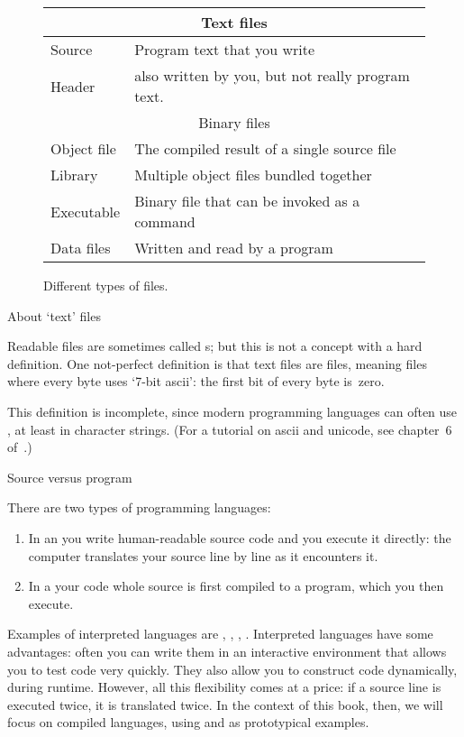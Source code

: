\begin{figure}[ht]
  \begin{tabular}{|l|l|}
    \midrule
    \multicolumn{2}{|c|}{Text files}\\
    \midrule
    Source&Program text that you write\\
    Header&also written by you, but not really program text.\\
    \midrule
    \multicolumn{2}{|c|}{Binary files}\\
    \midrule
    Object file&The compiled result of a single source file\\
    Library&Multiple object files bundled together\\
    Executable&Binary file that can be invoked as a command\\
    Data files&Written and read by a program\\
    \midrule
  \end{tabular}
  \caption{Different types of files.}
  \label{fig:file-types}
\end{figure}

 {About `text' files}

Readable files are sometimes called s;
but this is not a concept with a hard definition.
One not-perfect definition is that text files are  files,
meaning files where every byte uses `7-bit ascii': the first bit of every
byte is~zero.

This definition is incomplete, since modern programming languages
can often use , at least in character strings.
(For a tutorial on ascii and unicode, see chapter~6
of~\cite{Eijkhout:TeXscience}.)

 {Source versus program}

There are two types of programming languages:
\begin{enumerate}
\item In an  you write
  human-readable source code and you execute it directly: the computer
  translates your source line by line as it encounters it. 
\item In a  your code whole source
  is first compiled to a program, which you then execute.
\end{enumerate}
Examples of interpreted languages are ,
, , .
Interpreted languages have some advantages: often you can write them
in an interactive environment that allows you to test code very
quickly. They also allow you to construct code dynamically, during
runtime. However, all this flexibility comes at a price: if a source
line is executed twice, it is translated twice. In the context of this
book, then, we will focus on compiled languages, using 
and  as prototypical examples.

